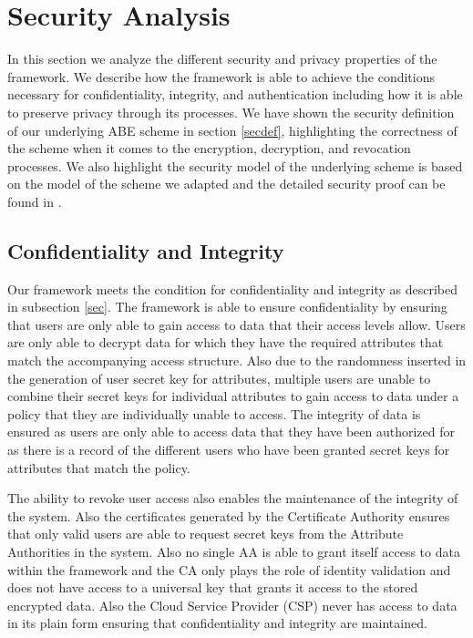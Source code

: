 \section{Security Analysis}

In this section we analyze the different security and privacy properties of the framework. We describe how the framework is able to achieve the conditions necessary for confidentiality, integrity, and authentication including how it is able to preserve privacy through its processes. We have shown the security definition of our underlying ABE scheme in section \ref{secdef}, highlighting the correctness of the scheme when it comes to the encryption, decryption, and revocation processes. We also highlight the security model of the underlying scheme is based on the model of the scheme we adapted and the detailed security proof can be found in \cite{Yang2014}.

\subsection*{Confidentiality and Integrity}

Our framework meets the condition for confidentiality and integrity as described in subsection \ref{sec}. The framework is able to ensure confidentiality by ensuring that users are only able to gain access to data that their access levels allow. Users are only able to decrypt data for which they have the required attributes that match the accompanying access structure. Also due to the randomness inserted in the generation of user secret key for attributes, multiple users are unable to combine their secret keys for individual attributes to gain access to data under a policy that they are individually unable to access. The integrity of data is ensured as users are only able to access data that they have been authorized for as there is a record of the different users who have been granted secret keys for attributes that match the policy.

The ability to revoke user access also enables the maintenance of the integrity of the system. Also the certificates generated by the Certificate Authority ensures that only valid users are able to request secret keys from the Attribute Authorities in the system. Also no single AA is able to grant itself access to data within the framework and the CA only plays the role of identity validation and does not have access to a universal key that grants it access to the stored encrypted data. Also the Cloud Service Provider (CSP) never has access to data in its plain form ensuring that confidentiality and integrity are maintained.

